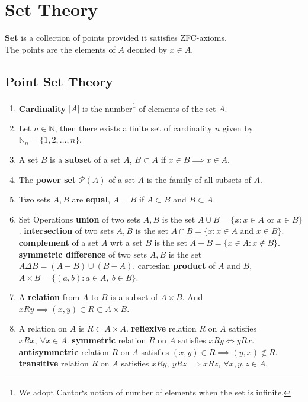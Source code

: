 \chapter{Set Theory}
	\textbf{Set} is a collection of points provided it satisfies ZFC-axioms.\\
	The points are the elements of $A$ deonted by $x \in A$.

\section{Point Set Theory}
\begin{enumerate}
	\item \textbf{Cardinality} $|A|$ is the number\footnote{We adopt Cantor`s notion of number of elements when the set is infinite.} of elements of the set $A$.
	\item Let $n \in \mathbb{N}$, then there exists a finite set of cardinality $n$ given by  $\mathbb{N}_n = \{ 1,2,\dots, n \}$. 
	\item A set $B$ is a \textbf{subset} of a set $A$, $B \subset A$ if $x \in B \implies x \in A$.
	\item The \textbf{power set} $\mathcal{P}(A)$ of a set $A$ is the family of all subsets of $A$.
	\item Two sets $A,B$ are \textbf{equal}, $A = B$ if $A \subset B$ and $B \subset A$.
	\item Set Operations
		\subitem \textbf{union} of two sets $A,B$ is the set $A \cup B = \{ x : x \in A \text{ or } x \in B\}$.
		\subitem \textbf{intersection} of two sets $A,B$ is the set $A \cap B = \{ x : x \in A \text{ and } x \in B\}$.
		\subitem \textbf{complement} of a set $A$ wrt a set $B$ is the set $A-B = \{ x \in A : x \notin B\}$.
		\subitem \textbf{symmetric difference} of two sets $A,B$ is the set $A \Delta B = (A-B) \cup (B-A)$.
		\subitem cartesian \textbf{product} of $A$ and $B$, $A \times B = \{ (a,b) : a \in A,\ b \in B\}$.
	\item A \textbf{relation} from $A$ to $B$ is a subset of $A \times B$.
	And $xRy \implies (x,y) \in R \subset A \times B$.
	\item A relation on $A$ is $R \subset A \times A$.
		\subitem \textbf{reflexive} relation $R$ on $A$ satisfies $xRx,\ \forall x \in A$.
		\subitem \textbf{symmetric} relation $R$ on $A$ satisfies $xRy \iff yRx$.
		\subitem \textbf{antisymmetric} relation $R$ on $A$ satisfies $(x,y) \in R \implies (y,x) \notin R$.
		\subitem \textbf{transitive} relation $R$ on $A$ satisfies $xRy,\ yRz \implies xRz,\ \forall x,y,z \in A$.

\end{enumerate}
